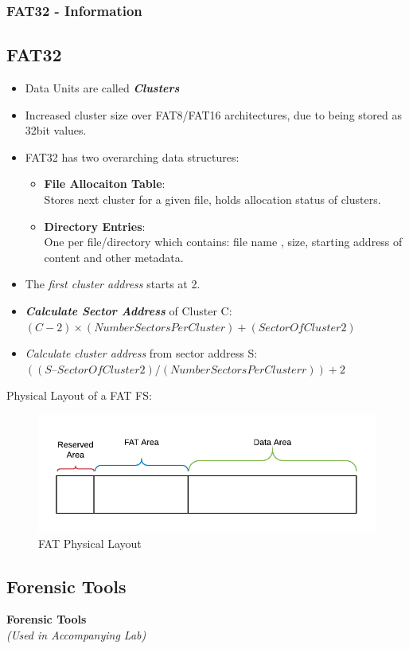 \documentclass{beamer}
\begin{document}
\begin{frame}[allowframebreaks]
	\frametitle{FAT32 - Information}
	\subsection*{FAT32}
	\begin{itemize}
		\item Data Units are called \textbf{\textit{Clusters}}
		\item Increased cluster size over FAT8/FAT16 architectures, due to being stored as 32bit values.
		\item FAT32 has two overarching data structures:
			\begin{itemize}
				\item \textbf{File Allocaiton Table}: \\
				Stores next cluster for a given file, holds allocation status of clusters.
				\item \textbf{Directory Entries}:\\
				One per file/directory which contains: file name , size, starting address of content and other metadata.
			\end{itemize}
		\item The \textit{first cluster address} starts at 2. 
		\item \textbf{\textit{Calculate Sector Address}} of Cluster C:\\ 
			$(C-2)\times (NumberSectorsPerCluster) + (SectorOfCluster2)$
		\item \textit{Calculate cluster address} from sector address S:\\
			$((S – SectorOfCluster2) / (NumberSectorsPerClusterr)) + 2$
	\end{itemize}
	\newpage
	Physical Layout of a FAT FS:
	\begin{figure}
		\includegraphics[scale=0.8]{fat-phys-layout}
		\caption{FAT Physical Layout}
		\label{fig:fat-phys-layout}
	\end{figure}
\end{frame}
\begin{frame}%
	\section{Forensic Tools}
	\begin{center}
		\Huge\textbf{Forensic Tools}\\
		\large\textit{(Used in Accompanying Lab)}
	\end{center}
\end{frame}
\end{document}
